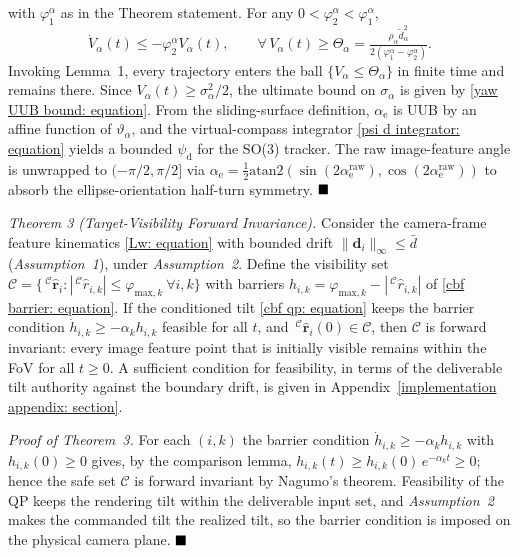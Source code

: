 \documentclass{IEEEtaes}
\begin{document}
with $\varphi_1^\alpha$ as in the Theorem statement. For any $0<\varphi_2^\alpha<\varphi_1^\alpha$,
\begin{equation*}
\dot{V}_\alpha(t)\le -\varphi_2^\alpha V_\alpha(t),\qquad \forall\,V_\alpha(t)\ge\Theta_\alpha = \tfrac{\rho_\alpha\tilde{d}_\alpha^2}{2(\varphi_1^\alpha-\varphi_2^\alpha)}.
\end{equation*}
Invoking Lemma~1, every trajectory enters the ball $\{V_\alpha\le\Theta_\alpha\}$ in finite time and remains there. Since $V_\alpha(t)\ge\sigma_\alpha^2/2$, the ultimate bound on $\sigma_\alpha$ is given by \eqref{yaw UUB bound: equation}. From the sliding-surface definition, $\alpha_\text{e}$ is UUB by an affine function of $\vartheta_\alpha$, and the virtual-compass integrator \eqref{psi d integrator: equation} yields a bounded $\psi_\text{d}$ for the SO(3) tracker. The raw image-feature angle is unwrapped to $(-\pi/2,\pi/2]$ via $\alpha_\text{e} = \tfrac12\text{atan2}(\sin(2\alpha_\text{e}^\text{raw}),\cos(2\alpha_\text{e}^\text{raw}))$ to absorb the ellipse-orientation half-turn symmetry. $\hfill\blacksquare$

\textit{Theorem 3 (Target-Visibility Forward Invariance).}
Consider the camera-frame feature kinematics \eqref{Lw: equation} with bounded drift $\|\boldsymbol{d}_i\|_\infty\le\bar{d}$ (\textit{Assumption~1}), under \textit{Assumption~2}. Define the visibility set $\mathcal{C}=\{\,^\mathcal{C}\hat{\boldsymbol{r}}_i:|\,^\mathcal{C}\hat{r}_{i,k}|\le\varphi_{\text{max},k}\ \forall i,k\}$ with barriers $h_{i,k}=\varphi_{\text{max},k}-|\,^\mathcal{C}\hat{r}_{i,k}|$ of \eqref{cbf barrier: equation}. If the conditioned tilt \eqref{cbf qp: equation} keeps the barrier condition $\dot{h}_{i,k}\ge-\alpha_k h_{i,k}$ feasible for all $t$, and $\,^\mathcal{C}\hat{\boldsymbol{r}}_i(0)\in\mathcal{C}$, then $\mathcal{C}$ is forward invariant: every image feature point that is initially visible remains within the FoV for all $t\ge 0$. A sufficient condition for feasibility, in terms of the deliverable tilt authority against the boundary drift, is given in Appendix~\ref{implementation appendix: section}.

\textit{Proof of Theorem~3.} For each $(i,k)$ the barrier condition $\dot{h}_{i,k}\ge-\alpha_k h_{i,k}$ with $h_{i,k}(0)\ge 0$ gives, by the comparison lemma, $h_{i,k}(t)\ge h_{i,k}(0)\,e^{-\alpha_k t}\ge 0$; hence the safe set $\mathcal{C}$ is forward invariant by Nagumo's theorem. Feasibility of the QP keeps the rendering tilt within the deliverable input set, and \textit{Assumption~2} makes the commanded tilt the realized tilt, so the barrier condition is imposed on the physical camera plane. $\hfill\blacksquare$
\end{document}
